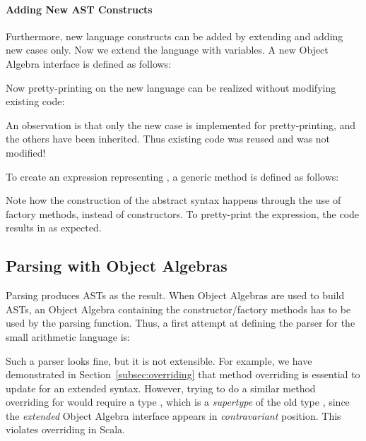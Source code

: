 \paragraph{Adding New AST Constructs}
Furthermore, new language constructs can be added by extending  and adding new cases only. Now we extend the language
with variables. A new Object Algebra interface  is defined as follows:

Now pretty-printing on the new language can be realized without modifying existing code:

An observation is that only the new case is implemented for pretty-printing, and the others have been inherited.
Thus existing code was reused and was not modified!

To create an expression representing , a generic method is defined as follows:


Note how the construction of the abstract syntax happens through
the use of factory methods, instead of constructors.
To pretty-print the expression, the code 
results in  as expected.

\subsection{Parsing with Object Algebras}\label{subsec:parsingwithoa}

Parsing produces ASTs as the result. When Object Algebras are used
to build ASTs, an Object Algebra containing the constructor/factory
methods has to be used by the parsing function. Thus, a first attempt
at defining the parser for the small arithmetic language is:

Such a parser looks fine, but it is not extensible. For example, we have demonstrated in Section~\ref{subsec:overriding} that method overriding is essential to update  for an extended syntax. However, trying to do a similar method overriding for  would require a type  , which is a \emph{supertype} of the old type  , since
the \emph{extended} Object Algebra interface appears in \emph{contravariant} position. This violates
overriding in Scala.


